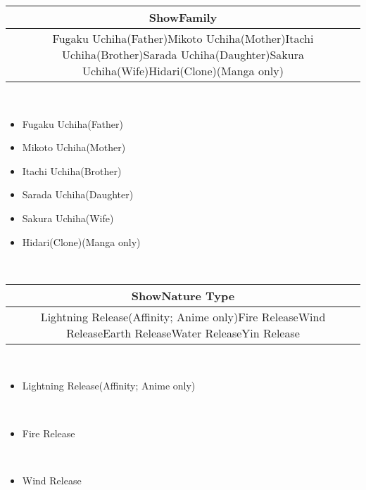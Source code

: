 \documentclass[a4paper,12pt]{article}
\begin{document}
\begin{tabular}{|c|} \hline
ShowFamily \\
 \hline
Fugaku Uchiha(Father)Mikoto Uchiha(Mother)Itachi Uchiha(Brother)Sarada Uchiha(Daughter)Sakura Uchiha(Wife)Hidari(Clone)(Manga only) \\
\end{tabular}\\ \par \vspace{0.5cm}

\begin{itemize}
\item Fugaku Uchiha(Father)
\item Mikoto Uchiha(Mother)
\item Itachi Uchiha(Brother)
\item Sarada Uchiha(Daughter)
\item Sakura Uchiha(Wife)
\item Hidari(Clone)(Manga only)
\end{itemize}\\ \par \vspace{0.5cm}

\begin{tabular}{|c|} \hline
ShowNature Type \\
 \hline
Lightning Release(Affinity; Anime only)Fire ReleaseWind ReleaseEarth ReleaseWater ReleaseYin Release \\
\end{tabular}\\ \par \vspace{0.5cm}

\begin{itemize}
\item Lightning Release(Affinity; Anime only)
\end{itemize}\\ \par \vspace{0.5cm}

\begin{itemize}
\item Fire Release
\end{itemize}\\ \par \vspace{0.5cm}

\begin{itemize}
\item Wind Release
\end{itemize}\\ \par \vspace{0.5cm}
\end{document}
